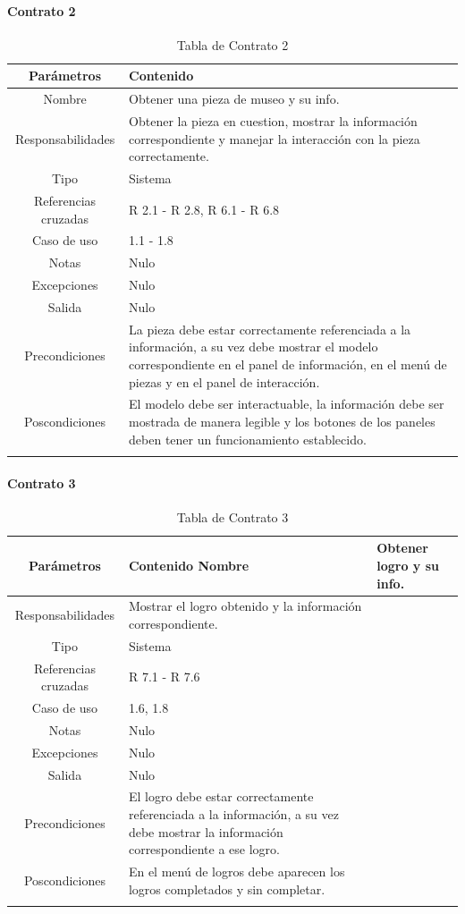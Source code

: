 \paragraph{Contrato 2} 
\begin{longtable}{|c|p{7cm}|}
\hline 
Parámetros & Contenido\\ 
\hline
Nombre & Obtener una pieza de museo y su info.\\ 
\hline
Responsabilidades & Obtener la pieza en cuestion, mostrar la información correspondiente y manejar la interacción con la pieza correctamente.\\ 
\hline
Tipo & Sistema\\ 
\hline
Referencias cruzadas & R 2.1 - R 2.8, R 6.1 - R 6.8\\ 
\hline
Caso de uso & 1.1 - 1.8\\ 
\hline
Notas & Nulo\\ 
\hline
Excepciones & Nulo\\ 
\hline
Salida & Nulo\\ 
\hline
Precondiciones & La pieza debe estar correctamente referenciada a la información, a su vez debe mostrar el modelo correspondiente en el panel de información, en el menú de piezas y en el panel de interacción.\\ 
\hline
Poscondiciones &El modelo debe ser interactuable, la información debe ser mostrada de manera legible y los botones de los paneles deben tener un funcionamiento establecido. \\ 
\hline
\caption{Tabla de Contrato 2}
\label{tabCont2}\\
\end{longtable}

\paragraph{Contrato 3} 
\begin{longtable}{|c|p{7cm}|}
\hline 
Parámetros & Contenido
\hline
Nombre & Obtener logro y su info.\\ 
\hline
Responsabilidades & Mostrar el logro obtenido y la información correspondiente.\\ 
\hline
Tipo & Sistema\\ 
\hline
Referencias cruzadas & R 7.1 - R 7.6\\ 
\hline
Caso de uso & 1.6, 1.8\\ 
\hline
Notas & Nulo\\ 
\hline
Excepciones & Nulo\\ 
\hline
Salida & Nulo\\ 
\hline
Precondiciones &  El logro debe estar correctamente referenciada a la información, a su vez debe mostrar la información correspondiente a ese logro.\\ 
\hline
Poscondiciones & En el menú de logros debe aparecen los logros completados y sin completar.\\ 
\hline
\caption{Tabla de Contrato 3}
\label{tabCont3}\\
\end{longtable}

